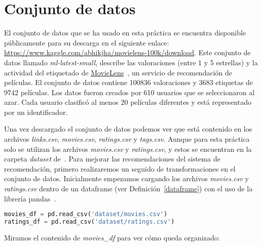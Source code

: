 \documentclass{uimppracticas}
\begin{document}
\section{Conjunto de datos}\label{conjunto_datos}

El conjunto de datos que se ha usado en esta práctica se encuentra disponible públicamente para su descarga en el siguiente enlace: \url{https://www.kaggle.com/abhikjha/movielens-100k/download}. Este conjunto de datos llamado \textit{ml-latest-small}, describe las valoraciones (entre 1 y 5 estrellas) y la actividad del etiquetado de \href{http://movielens.org}{MovieLens}~\cite{MovieLens}, un servicio de recomendación de películas. El conjunto de datos contiene 100836 valoraciones y 3683 etiquetas de 9742 películas. Los datos fueron creados por 610 usuarios que se seleccionaron al azar. Cada usuario clasificó al menos 20 películas diferentes y está representado por un identificador.

Una vez descargado el conjunto de datos podemos ver que está contenido en los archivos \textit{links.csv}, \textit{movies.csv}, \textit{ratings.csv} y \textit{tags.csv}. Aunque para esta práctica solo se utilizan los archivos \textit{movies.csv} y \textit{ratings.csv}, y estos se encuentran en la carpeta \textit{dataset} de~\cite{GitHubRepo}. Para mejorar las recomendaciones del sistema de recomendación, primero realizaremos un seguido de transformaciones en el conjunto de datos. Inicialmente empezamos cargando los archivos \textit{movies.csv} y \textit{ratings.csv} dentro de un dataframe (ver Definición~\ref{dataframe}) con el uso de la librería pandas~\cite{pandas}.

\begin{lstlisting}[language=python, basicstyle=\small]
movies_df = pd.read_csv('dataset/movies.csv')
ratings_df = pd.read_csv('dataset/ratings.csv')
\end{lstlisting}

Miramos el contenido de \textit{movies\_df} para ver cómo queda organizado:
\end{document}
